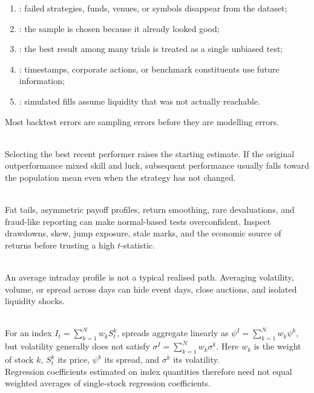 \begin{taxonomy} 
\begin{enumerate}[label=\roman*.]
\setlength{\itemsep}{0pt}
\item {}: failed strategies, funds, venues, or symbols disappear from the dataset;
\item {}: the sample is chosen because it already looked good;
\item {}: the best result among many trials is treated as a single unbiased test;
\item {}: timestamps, corporate actions, or benchmark constituents use future information;
\item {}: simulated fills assume liquidity that was not actually reachable.
\end{enumerate}
Most backtest errors are sampling errors before they are modelling errors.
\end{taxonomy}

\begin{caveat} \\
Selecting the best recent performer raises the starting estimate. If the original outperformance mixed skill and luck, subsequent performance usually falls toward the population mean even when the strategy has not changed.
\end{caveat}

\begin{caveat} \\
Fat tails, asymmetric payoff profiles, return smoothing, rare devaluations, and fraud-like reporting can make normal-based tests overconfident. Inspect drawdowns, skew, jump exposure, stale marks, and the economic source of returns before trusting a high $t$-statistic.
\end{caveat}

\begin{caveat} \\
An average intraday profile is not a typical realised path. Averaging volatility, volume, or spread across days can hide event days, close auctions, and isolated liquidity shocks.
\end{caveat}

\begin{model} \\
For an index $I_t=\sum_{k=1}^{N}w_kS_t^k$, spreads aggregate linearly as $\psi^I=\sum_{k=1}^{N}w_k\psi^k$, but volatility generally does not satisfy $\sigma^I=\sum_{k=1}^{N}w_k\sigma^k$. Here $w_k$ is the weight of stock $k$, $S_t^k$ its price, $\psi^k$ its spread, and $\sigma^k$ its volatility.\\
Regression coefficients estimated on index quantities therefore need not equal weighted averages of single-stock regression coefficients.
\end{model}
